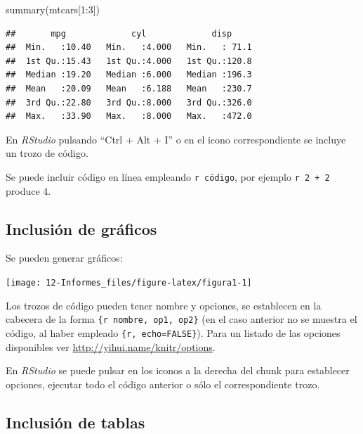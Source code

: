 \documentclass[
]{book}
\newenvironment{Shaded}{\begin{snugshade}}{\end{snugshade}}
\newcommand{\DecValTok}[1]{\textcolor[rgb]{0.00,0.00,0.81}{#1}}
\newcommand{\FunctionTok}[1]{\textcolor[rgb]{0.00,0.00,0.00}{#1}}
\newcommand{\NormalTok}[1]{#1}
\newcommand{\SpecialCharTok}[1]{\textcolor[rgb]{0.00,0.00,0.00}{#1}}
\theoremstyle{break}
\begin{document}
\begin{Shaded}
\begin{Highlighting}[]
\FunctionTok{summary}\NormalTok{(mtcars[}\DecValTok{1}\SpecialCharTok{:}\DecValTok{3}\NormalTok{])}
\end{Highlighting}
\end{Shaded}

\begin{verbatim}
##       mpg             cyl             disp      
##  Min.   :10.40   Min.   :4.000   Min.   : 71.1  
##  1st Qu.:15.43   1st Qu.:4.000   1st Qu.:120.8  
##  Median :19.20   Median :6.000   Median :196.3  
##  Mean   :20.09   Mean   :6.188   Mean   :230.7  
##  3rd Qu.:22.80   3rd Qu.:8.000   3rd Qu.:326.0  
##  Max.   :33.90   Max.   :8.000   Max.   :472.0
\end{verbatim}

En \emph{RStudio} pulsando ``Ctrl + Alt + I'' o en el icono correspondiente se incluye un trozo de código.

Se puede incluir código en línea empleando \texttt{\textasciigrave{}r\ código\textasciigrave{}},
por ejemplo \texttt{\textasciigrave{}r\ 2\ +\ 2\textasciigrave{}} produce 4.

\hypertarget{inclusiuxf3n-de-gruxe1ficos}{%
\subsection{Inclusión de gráficos}\label{inclusiuxf3n-de-gruxe1ficos}}

Se pueden generar gráficos:

\begin{center}\texttt{[image: 12-Informes\_files/figure-latex/figura1-1]} \end{center}

Los trozos de código pueden tener nombre y opciones, se establecen en la cabecera de la forma
\texttt{\textasciigrave{}\textasciigrave{}\textasciigrave{}\{r\ nombre,\ op1,\ op2\}}
(en el caso anterior no se muestra el código, al haber empleado \texttt{\textasciigrave{}\textasciigrave{}\textasciigrave{}\{r,\ echo=FALSE\}}).
Para un listado de las opciones disponibles ver \url{http://yihui.name/knitr/options}.

En \emph{RStudio} se puede pulsar en los iconos a la derecha del chunk para establecer opciones,
ejecutar todo el código anterior o sólo el correspondiente trozo.

\hypertarget{inclusiuxf3n-de-tablas}{%
\subsection{Inclusión de tablas}\label{inclusiuxf3n-de-tablas}}
\end{document}
